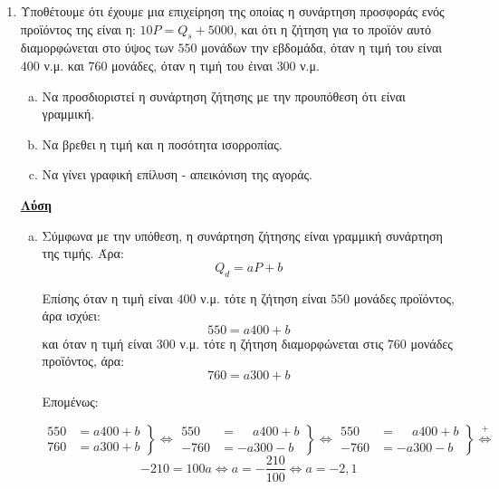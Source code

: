 






\begin{center}
\end{center}

\vspace{2\baselineskip}

\begin{enumerate}
\item Υποθέτουμε ότι έχουμε μια επιχείρηση της οποίας η συνάρτηση προσφοράς ενός προϊόντος της είναι η: $10P=Q_s+5000$, και ότι η ζήτηση για το προϊόν αυτό διαμορφώνεται στο ύψος των $550$ μονάδων την εβδομάδα, όταν η τιμή του είναι $400$ ν.μ. και $760$ μονάδες, όταν η τιμή του έιναι $300$ ν.μ.
\begin{enumerate}[a)]
\item Να προσδιοριστεί η συνάρτηση ζήτησης με την προυπόθεση ότι είναι γραμμική.
\item Να βρεθει η τιμή και η ποσότητα ισορροπίας.
\item Να γίνει γραφική επίλυση - απεικόνιση της αγοράς.
\end{enumerate}

\underline{\bfseries Λύση}

\begin{enumerate}[a)]

\item Σύμφωνα με την υπόθεση, η συνάρτηση ζήτησης είναι γραμμική συνάρτηση της τιμής. Άρα:
\begin{equation}\label{eq:demand}
Q_d=aP+b
\end{equation}

Επίσης όταν η τιμή είναι $400$ ν.μ. τότε η ζήτηση είναι $550$ μονάδες προϊόντος, άρα ισχύει:
\begin{equation}\label{eq:dem1}
550=a400+b
\end{equation}
και όταν η τιμή είναι $300$ ν.μ. τότε η ζήτηση διαμορφώνεται στις $760$ μονάδες προϊόντος, άρα:
\[
760=a300+b
\]

Επομένως:

\[
\left.
\begin{align*}
550&=a400+b \\
760&=a300+b
\end{align*}
\right\}\Leftrightarrow
\left.
\begin{align*}
550&=\phantom{-}a400+b \\
-760&=-a300-b
\end{align*}
\right\}\Leftrightarrow
\left.
\begin{align*}
550&=\phantom{-}a400+b \\
-760&=-a300-b
\end{align*}
\right\}\overset{+}{\Leftrightarrow}
\]
\[
-210=100a \Leftrightarrow a=-\frac{210}{100} \Leftrightarrow a=-2,1
\]


\end{enumerate}
\end{enumerate}
